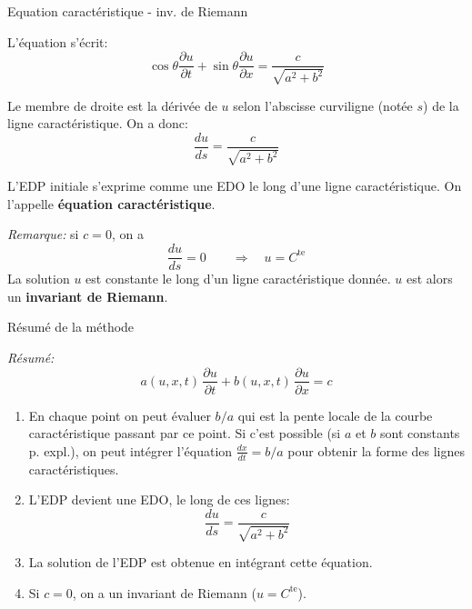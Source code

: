 \documentclass[
mode=present,    %
paper=a4paper,   %
orient=landscape,
display=slides,   %
size=10pt,
style=romain   %
]{powerdot}
\begin{document}
\begin{slide}[toc=Equ. caractéristique]{Equation caractéristique - inv. de Riemann}

L'équation s'écrit:
\begin{equation*}
    \cos\theta \frac{\partial u}{\partial t} + \sin\theta \frac{\partial u}{\partial x} = \frac{c}{\sqrt{a^2+b^2}}
\end{equation*}

\bigskip

Le membre de droite est la dérivée de $u$ selon l'abscisse curviligne (notée $s$) de la ligne caractéristique. On a donc:
\begin{equation*}
    \boxed{ \frac{d u}{ds} = \frac{c}{\sqrt{a^2+b^2}} }
\end{equation*}

L'EDP initiale s'exprime comme une EDO le long d'une ligne caractéristique. On l'appelle \textbf{équation caractéristique}.

\bigskip

\emph{Remarque:} si $c=0$, on a
\begin{equation*}
    \frac{d u}{ds} = 0 \qquad \Rightarrow \quad u=C^{\text{te}}
\end{equation*}
La solution $u$ est constante le long d'un ligne caractéristique donnée.
$u$ est alors un \textbf{invariant de Riemann}.



\end{slide}



\begin{slide}[toc=Résumé]{Résumé de la méthode}

\emph{Résumé:}
\begin{equation*}
a(u,x,t)\, \frac{\partial u}{\partial t} + b(u,x,t)\, \frac{\partial u}{\partial x} = c
\end{equation*}

\begin{enumerate}
\item En chaque point on peut évaluer $b/a$ qui est la pente locale de la courbe caractéristique passant par ce point. Si c'est possible (si $a$ et $b$ sont constants p. expl.), on peut intégrer l'équation $\frac{dx}{dt}=b/a$ pour obtenir la forme des lignes caractéristiques.
\item L'EDP devient une EDO, le long de ces lignes:
    \begin{equation*}
    \frac{d u}{ds} = \frac{c}{\sqrt{a^2+b^2}}
    \end{equation*}
\item La solution de l'EDP est obtenue en intégrant cette équation.
\item Si $c=0$, on a un invariant de Riemann ($u=C^{\text{te}}$).
\end{enumerate}

\end{slide}
\end{document}
